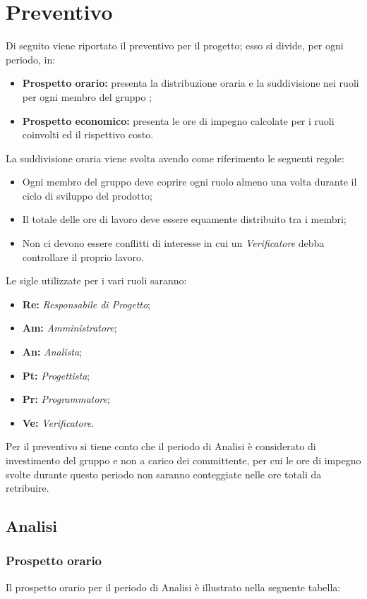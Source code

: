 \chapter{Preventivo}
Di seguito viene riportato il preventivo per il progetto; esso si divide, per ogni periodo, in:
\begin{itemize}
	\item \textbf{Prospetto orario:} presenta la distribuzione oraria e la suddivisione nei ruoli per ogni membro del gruppo ;
	\item \textbf{Prospetto economico:} presenta le ore di impegno calcolate per i ruoli coinvolti ed il rispettivo costo.
\end{itemize}
La suddivisione oraria viene svolta avendo come riferimento le seguenti regole:
\begin{itemize}
	\item Ogni membro del gruppo deve coprire ogni ruolo almeno una volta durante il ciclo di sviluppo del prodotto;
	\item Il totale delle ore di lavoro deve essere equamente distribuito tra i membri;
	\item Non ci devono essere conflitti di interesse in cui un \textit{Verificatore} debba controllare il proprio lavoro.
\end{itemize}
Le sigle utilizzate per i vari ruoli saranno:
\begin{itemize}
	\item \textbf{Re:} \textit{Responsabile di Progetto};
	\item \textbf{Am:} \textit{Amministratore};
	\item \textbf{An:} \textit{Analista};
	\item \textbf{Pt:} \textit{Progettista};
	\item \textbf{Pr:} \textit{Programmatore};
	\item \textbf{Ve:} \textit{Verificatore}.
\end{itemize}

Per il preventivo si tiene conto che il periodo di Analisi è considerato di investimento del gruppo e non a carico dei committente, per cui le ore di impegno svolte durante questo periodo non saranno conteggiate nelle ore totali da retribuire.

\newpage
\section{Analisi }
\subsection{Prospetto orario}
Il prospetto orario per il periodo di Analisi è illustrato nella seguente tabella:

